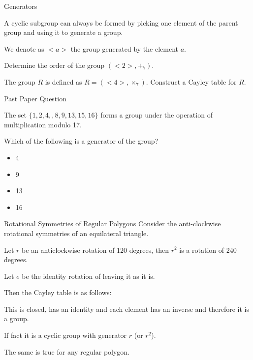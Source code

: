 \documentclass[8pt]{beamer}
\begin{document}
\begin{frame}{Generators}
	\begin{definition}
		A cyclic subgroup can always be formed by picking one element of the parent group and using it to generate a group.

		We denote as $<a>$ the group generated by the element  $a$.
	\end{definition}

	\begin{Problem}
		Determine the order of the group $(<2>,+_7)$.
	\end{Problem}


		\begin{Problem}
			The group $R$ is defined as  $R=(<4>,\times _7)$. Construct a Cayley table for  $R$.
			
		\end{Problem}
	
\end{frame}

\begin{frame}{Past Paper Question}
	\begin{Problem}
	The set $\{1,2,4,,8,9,13,15,16\}$ forms a group under the operation of multiplication modulo 17.

	Which of the following is a generator of the group?

	 \begin{itemize}
		\item 4
		\item 9
		\item 13
		\item 16
	\end{itemize}
\end{Problem}

\end{frame}

\begin{frame}{Rotational Symmetries of Regular Polygons}
	Consider the anti-clockwise rotational symmetries of an equilateral triangle.

	Let $r$ be an anticlockwise rotation of 120 degrees, then $r^2$ is a rotation of 240 degrees.

	Let $e$ be the identity rotation of leaving it as it is.

	Then the Cayley table is as follows:

	This is closed, has an identity and each element has an inverse and therefore it is a group. 

	If fact it is a cyclic group with generator  $r$ (or  $r^2$).

	The same is true for any regular polygon.
\end{frame}
\end{document}
